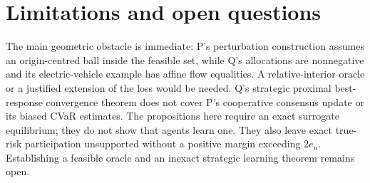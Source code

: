 \documentclass{article}
\begin{document}
\section{Limitations and open questions}

The main geometric obstacle is immediate: P's perturbation construction assumes an origin-centred ball inside the feasible set, while Q's allocations are nonnegative and its electric-vehicle example has affine flow equalities. A relative-interior oracle or a justified extension of the loss would be needed. Q's strategic proximal best-response convergence theorem does not cover P's cooperative consensus update or its biased CVaR estimates. The propositions here require an exact surrogate equilibrium; they do not show that agents learn one. They also leave exact true-risk participation unsupported without a positive margin exceeding \(2e_n\). Establishing a feasible oracle and an inexact strategic learning theorem remains open. %



\end{document}
